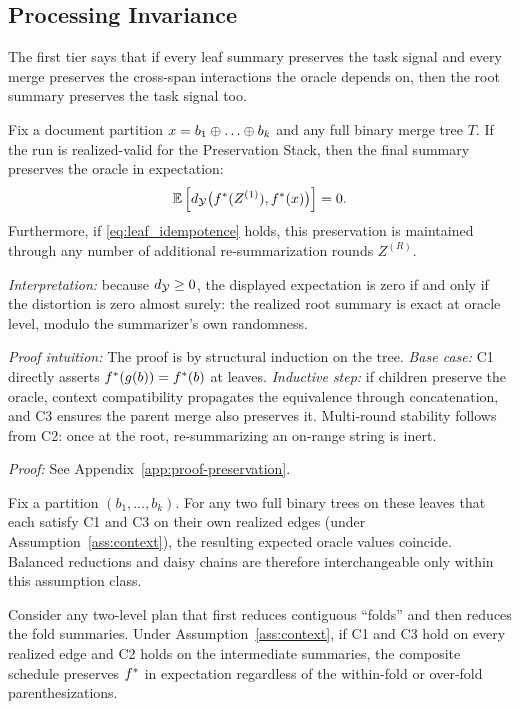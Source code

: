 \subsection{Processing Invariance}

The first tier says that if every leaf summary preserves the task signal and every merge preserves the cross-span interactions the oracle depends on, then the root summary preserves the task signal too.

\begin{theorem}\label{thm:one-pass}
Fix a document partition $x = b_1 \concat \dots \concat b_k$ and any full binary merge tree $T$. If the run is realized-valid for the Preservation Stack, then the final summary preserves the oracle in expectation:
\[
\mathbb{E}\left[d_{\mathcal{Y}}\big(f^\ast(Z^{(1)}), f^\ast(x)\big)\right] = 0.
\]
Furthermore, if \ref{eq:leaf_idempotence} holds, this preservation is maintained through any number of additional re-summarization rounds $Z^{(R)}$.
\end{theorem}

\noindent\textit{Interpretation:} because $d_{\mathcal{Y}} \ge 0$, the displayed expectation is zero if and only if the distortion is zero almost surely: the realized root summary is exact at oracle level, modulo the summarizer's own randomness.

\noindent\textit{Proof intuition:} The proof is by structural induction on the tree. \emph{Base case:} C1 directly asserts $f^\ast(g(b)) = f^\ast(b)$ at leaves. \emph{Inductive step:} if children preserve the oracle, context compatibility propagates the equivalence through concatenation, and C3 ensures the parent merge also preserves it. Multi-round stability follows from C2: once at the root, re-summarizing an on-range string is inert.

\noindent\textit{Proof:} See Appendix~\ref{app:proof-preservation}.

\begin{corollary}\label{cor:schedule}
Fix a partition $(b_1, \ldots, b_k)$. For any two full binary trees on these leaves that each satisfy C1 and C3 on their own realized edges (under Assumption~\ref{ass:context}), the resulting expected oracle values coincide. Balanced reductions and daisy chains are therefore interchangeable only within this assumption class.
\end{corollary}

\begin{corollary}\label{cor:folds}
Consider any two-level plan that first reduces contiguous ``folds'' and then reduces the fold summaries. Under Assumption~\ref{ass:context}, if C1 and C3 hold on every realized edge and C2 holds on the intermediate summaries, the composite schedule preserves $f^\ast$ in expectation regardless of the within-fold or over-fold parenthesizations.
\end{corollary}

